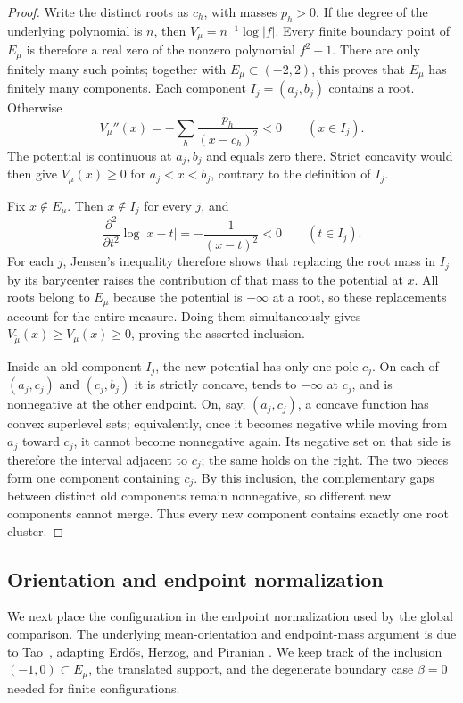 \documentclass[11pt]{article}
\numberwithin{equation}{section}
\theoremstyle{plain}
\theoremstyle{definition}
\theoremstyle{remark}
\newcommand{\1}{\mathbf 1}
\begin{document}
\begin{proof}
Write the distinct roots as $c_h$, with masses $p_h>0$.  If the degree of
the underlying polynomial is $n$, then $V_\mu=n^{-1}\log|f|$.  Every finite
boundary point of $E_\mu$ is therefore a real zero of the nonzero polynomial
$f^2-1$.  There are only finitely many such points; together with
$E_\mu\subset(-2,2)$, this proves that $E_\mu$ has finitely many components.
Each component $I_j=(a_j,b_j)$ contains a root.  Otherwise
\[
 V_\mu''(x)=-\sum_h\frac{p_h}{(x-c_h)^2}<0
 \qquad (x\in I_j).
\]
The potential is continuous at $a_j,b_j$ and equals zero there.  Strict
concavity would then give
$V_\mu(x)\ge0$ for $a_j<x<b_j$, contrary to the definition of $I_j$.

Fix $x\notin E_\mu$.  Then $x\notin I_j$ for every $j$, and
\[
 \frac{\partial^2}{\partial t^2}\log|x-t|
 =-\frac1{(x-t)^2}<0\qquad(t\in I_j).
\]
For each $j$, Jensen's inequality therefore shows that replacing the root
mass in $I_j$ by its barycenter raises the contribution of that mass to the
potential at $x$.  All roots belong to $E_\mu$ because the potential is
$-\infty$ at a root, so these replacements account for the entire measure.
Doing them simultaneously gives
$V_{\widetilde\mu}(x)\ge V_\mu(x)\ge0$, proving the asserted inclusion.

Inside an old component $I_j$, the new potential has only one pole $c_j$.
On each of $(a_j,c_j)$ and $(c_j,b_j)$ it is strictly concave, tends to
$-\infty$ at $c_j$, and is nonnegative at the other endpoint.  On, say,
$(a_j,c_j)$, a concave function has convex superlevel sets; equivalently,
once it becomes negative while moving from $a_j$ toward $c_j$, it cannot
become nonnegative again.  Its negative set on that side is therefore the
interval adjacent to $c_j$; the same holds on the right.  The two pieces
form one component containing $c_j$.  By this inclusion, the complementary gaps
between distinct old components remain nonnegative, so different new
components cannot merge.  Thus every new component contains exactly one
root cluster.
\end{proof}

\subsection{Orientation and endpoint normalization}

We next place the configuration in the endpoint normalization used by the
global comparison.  The underlying mean-orientation and endpoint-mass
argument is due to Tao~\cite[Lemma~3.2 and the discussion following
it]{Tao1038Updated}, adapting Erd\H{o}s, Herzog, and Piranian
\cite[Theorem~1]{EHP1958}.  We keep track of the inclusion
$(-1,0)\subset E_\mu$, the translated support, and the degenerate boundary
case $\beta=0$ needed for finite configurations.
\end{document}
